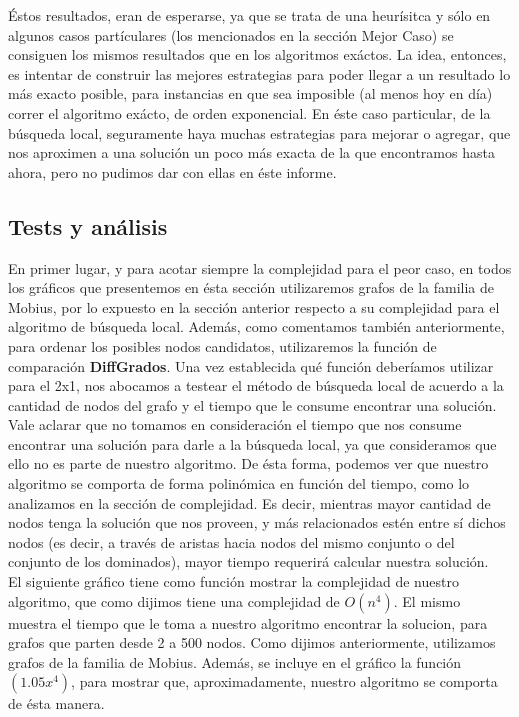 Éstos resultados, eran de esperarse, ya que se trata de una heurísitca y sólo en algunos casos partículares (los mencionados en la sección Mejor Caso) se consiguen los mismos resultados que en los algoritmos exáctos. La idea, entonces, es intentar de construir las mejores estrategias para poder llegar a un resultado lo más exacto posible, para instancias en que sea imposible (al menos hoy en día) correr el algoritmo exácto, de orden exponencial. En éste caso particular, de la búsqueda local, seguramente haya muchas estrategias para mejorar o agregar, que nos aproximen a una solución un poco más exacta de la que encontramos hasta ahora, pero no pudimos dar con ellas en éste informe.


\subsection{Tests y análisis}
En primer lugar, y para acotar siempre la complejidad para el peor caso, en todos los gráficos que presentemos en ésta sección utilizaremos grafos de la familia de Mobius, por lo expuesto en la sección anterior respecto a su complejidad para el algoritmo de búsqueda local. Además, como comentamos también anteriormente, para ordenar los posibles nodos candidatos, utilizaremos la función de comparación \textbf{DiffGrados}.
Una vez establecida qué función deberíamos utilizar para el 2x1, nos abocamos a testear el método de búsqueda local de acuerdo a la cantidad de nodos del grafo y el tiempo que le consume encontrar una solución. Vale aclarar que no tomamos en consideración el tiempo que nos consume encontrar una solución para darle a la búsqueda local, ya que consideramos que ello no es parte de nuestro algoritmo. De ésta forma, podemos ver que nuestro algoritmo se comporta de forma polinómica en función del tiempo, como lo analizamos en la sección de complejidad. Es decir, mientras mayor cantidad de nodos tenga la solución que nos proveen, y más relacionados estén entre sí dichos nodos (es decir, a través de aristas hacia nodos del mismo conjunto o del conjunto de los dominados), mayor tiempo requerirá calcular nuestra solución. \\
El siguiente gráfico tiene como función mostrar la complejidad de nuestro algoritmo, que como dijimos tiene una complejidad de $O(n^4)$. El mismo muestra el tiempo que le toma a nuestro algoritmo encontrar la solucion, para grafos que parten desde 2 a 500 nodos. Como dijimos anteriormente, utilizamos grafos de la familia de Mobius. Además, se incluye en el gráfico la función $(1.05x^4)$, para mostrar que, aproximadamente, nuestro algoritmo se comporta de ésta manera.  \\
